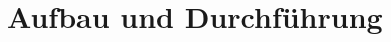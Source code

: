 \documentclass[a4paper,12pt,ngerman,oneside]{scrreprt}	%
\begin{document}
%	
		\section{Aufbau und Durchführung}
\end{document}
